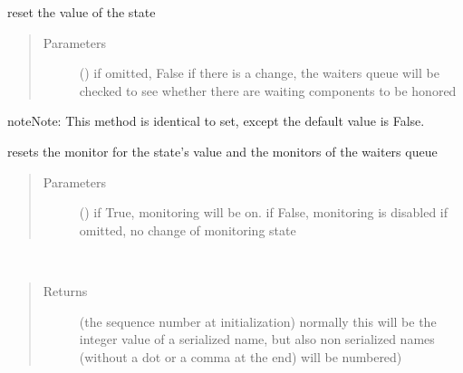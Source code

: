 \documentclass[letterpaper,10pt,english]{sphinxmanual}
\begin{document}
\begin{fulllineitems}
\begin{fulllineitems}
\label{\detokenize{Reference:salabim.State.reset}}
reset the value of the state
\begin{quote}\begin{description}
\item[{Parameters}] \leavevmode
{} (\sphinxstyleliteralemphasis{\sphinxupquote{ (}}\sphinxstyleliteralemphasis{\sphinxupquote{)}}) \textendash{} if omitted, False 
if there is a change, the waiters queue will be checked
to see whether there are waiting components to be honored

\end{description}\end{quote}

\begin{sphinxadmonition}{note}{Note:}
This method is identical to set, except the default value is False.
\end{sphinxadmonition}

\end{fulllineitems}


\begin{fulllineitems}
\label{\detokenize{Reference:salabim.State.reset_monitors}}
resets the monitor for the state’s value and the monitors of the waiters queue
\begin{quote}\begin{description}
\item[{Parameters}] \leavevmode
{} () \textendash{} if True, monitoring will be on. 
if False, monitoring is disabled 
if omitted, no change of monitoring state

\end{description}\end{quote}

\end{fulllineitems}


\begin{fulllineitems}
\label{\detokenize{Reference:salabim.State.sequence_number}}~\begin{quote}\begin{description}
\item[{Returns}] \leavevmode
{} \textendash{} (the sequence number at initialization) 
normally this will be the integer value of a serialized name,
but also non serialized names (without a dot or a comma at the end)
will be numbered)


\end{description}
\end{quote}
\end{fulllineitems}
\end{fulllineitems}
\end{document}

